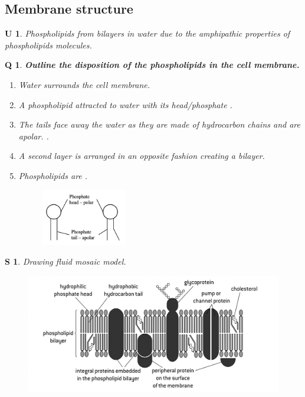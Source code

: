 \documentclass[12pt, a4paper]{article}
\newtheorem{und}{U}[subsection]
\newtheorem{skl}{S}[subsection]
\newtheorem{que}{Q}[subsection]
\begin{document}
\subsection{Membrane structure}
\begin{und}
    Phospholipids from bilayers in water due to the amphipathic properties of phospholipids molecules. 
\end{und}
\begin{tcolorbox}\begin{que}
    \textbf{Outline the disposition of the phospholipids in the cell membrane.}
    \begin{enumerate}
        \item Water surrounds the cell membrane.
        \item A phospholipid attracted to water with its head/phosphate {\color{red}{$\rightarrow$ hydrophilic}}.
        \item The tails face away the water as they are made of hydrocarbon chains and are apolar. {\color{red}{$\rightarrow$ hydrophobic}}.
        \item A second layer is arranged in an opposite fashion creating a bilayer. 
        \item Phospholipids are \textbf{\color{red}{amphipathic}}.
        \begin{multicols}{2}
        \begin{figure}[H]
            \center
            \includegraphics[width=0.35\textwidth]{Fig1.5.png}
        \end{figure}
        \end{multicols}
    \end{enumerate}
\end{que}\end{tcolorbox}
\begin{skl}
    Drawing fluid mosaic model. 
    \begin{figure}[H]
        \center
        \includegraphics[width=\textwidth]{Fig1.6.png}
    \end{figure}
\end{skl}
\end{document}
